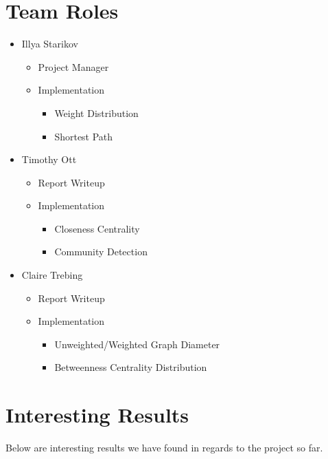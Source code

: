 \documentclass{article}
\begin{document}
\section{Team Roles}
\begin{itemize}
    \item Illya Starikov
    \begin{itemize}
        \item Project Manager
        \item Implementation
        \begin{itemize}
            \item Weight Distribution
            \item Shortest Path
        \end{itemize}
    \end{itemize}

    \item Timothy Ott
    \begin{itemize}
        \item Report Writeup
        \item Implementation
        \begin{itemize}
            \item Closeness Centrality
            \item Community Detection
        \end{itemize}
    \end{itemize}

    \item Claire Trebing
    \begin{itemize}
        \item Report Writeup
        \item Implementation
        \begin{itemize}
            \item Unweighted/Weighted Graph Diameter
            \item Betweenness Centrality Distribution
        \end{itemize}
    \end{itemize}
\end{itemize}

\section{Interesting Results}
Below are interesting results we have found in regards to the project so far.
\end{document}
